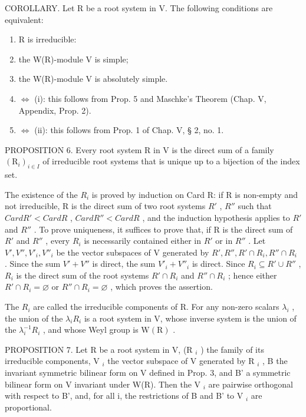COROLLARY. Let R be a root system in V. The following conditions are equivalent:

\begin{enumerate}
\def\labelenumi{(\roman{enumi})}
\item
  R is irreducible:
\item
  the W(R)-module V is simple;
\item
  the W(R)-module V is absolutely simple.
\item
  \(\Longleftrightarrow\) (i): this follows from Prop. 5 and Maschke's Theorem (Chap. V, Appendix, Prop. 2).
\item
  \(\Longleftrightarrow\) (ii): this follows from Prop. 1 of Chap. V, § 2, no. 1.
\end{enumerate}

PROPOSITION 6. Every root system R in V is the direct sum of a family \((\mathrm{R}_{i})_{i\in I}\) of irreducible root systems that is unique up to a bijection of the index set.

The existence of the \(R_{i}\) is proved by induction on Card R: if R is non-empty and not irreducible, R is the direct sum of two root systems \(R'\) , \(R''\) such that \(Card R' < Card R\) , \(Card R'' < Card R\) , and the induction hypothesis applies to \(R'\) and \(R''\) . To prove uniqueness, it suffices to prove that, if R is the direct sum of \(R'\) and \(R''\) , every \(R_i\) is necessarily contained either in \(R'\) or in \(R''\) . Let \(V', V'', V'_i, V''_i\) be the vector subspaces of V generated by \(R', R'', R' \cap R_i, R'' \cap R_i\) . Since the sum \(V' + V''\) is direct, the sum \(V'_i + V''_i\) is direct. Since \(R_i \subseteq R' \cup R''\) , \(R_i\) is the direct sum of the root systems \(R' \cap R_i\) and \(R'' \cap R_i\) ; hence either \(R' \cap R_i = \varnothing\) or \(R'' \cap R_i = \varnothing\) , which proves the assertion.

The \(R_{i}\) are called the irreducible components of R. For any non-zero scalars \(\lambda_{i}\) , the union of the \(\lambda_{i}R_{i}\) is a root system in V, whose inverse system is the union of the \(\lambda_{i}^{-1}R_{i}\) , and whose Weyl group is \(\mathrm{W}(\mathrm{R})\) .

PROPOSITION 7. Let R be a root system in V, (R \(_{i}\) ) the family of its irreducible components, V \(_{i}\) the vector subspace of V generated by R \(_{i}\) , B the invariant symmetric bilinear form on V defined in Prop. 3, and B' a symmetric bilinear form on V invariant under W(R). Then the V \(_{i}\) are pairwise orthogonal with respect to B', and, for all i, the restrictions of B and B' to V \(_{i}\) are proportional.

